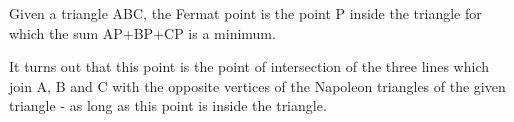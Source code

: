 Given a triangle ABC, the Fermat point is the point P inside the triangle for
which the sum AP+BP+CP is a minimum.
\par
It turns out that this point is the point of intersection of the three
lines which join A, B and C with the opposite vertices of the Napoleon triangles
of the given triangle - as long as this point is inside the triangle.